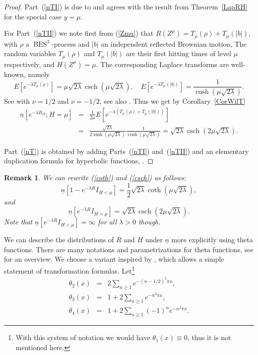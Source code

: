 \documentclass[11pt]{scrartcl}
\newtheorem{remark}[theorem]{Remark}
\newcommand{\nbid}{\underline{n}}
\DeclareMathOperator{\BES}{BES}
\DeclareMathOperator{\csch}{csch}
\begin{document}
\begin{proof}
Part~(\ref{nTI}) is due to \cite[p.66]{YY} and agrees with the result from Theorem~\ref{LapRH} for the special case $y=\mu$.

For Part~(\ref{nTII}) we note first from (\ref{Zmu}) that $R(Z^\mu)=T_\mu(\rho)+T_\mu(|b|)$,
with $\rho$ a $\BES^3$-process and $|b|$ an independent reflected Brownian motion,
The random variables $T_\mu(\rho)$ and $T_\mu(|b|)$ are their
first hitting times of level $\mu$ respectively, and $H(Z^\mu)=\mu$.
The corresponding Laplace transforms are well-known, namely
\begin{equation}
E[e^{-\lambda T_\mu(\rho)}]=\mu\sqrt{2\lambda}\csch(\mu\sqrt{2\lambda}),\quad
E[e^{-\lambda T_\mu(|b|)}]=\frac1{\cosh(\mu\sqrt{2\lambda})}.
\end{equation}
See \cite[(3.8), p.762]{Ken1978} with $\nu=1/2$ and $\nu=-1/2$, 
see also \cite[Tab.2, Row 3, Col.3, p.450 and Sec.4.5, p.453]{BPY2001}.
Thus we get by Corollary~\ref{CorWilT}
\begin{eqnarray}
\nbid[e^{-\lambda R_{II}};H=\mu]&=&
\frac1{2\mu}E[e^{-\lambda(T_\mu(\rho)+T_\mu(|b|))}]\\
&=&
\frac{\sqrt{2\lambda}}{2\sinh(\mu\sqrt{2\lambda})}
\frac1{\cosh(\mu\sqrt{2\lambda})}
=\sqrt{2\lambda}\csch(2\mu\sqrt{2\lambda}).
\end{eqnarray}


Part~(\ref{nT}) is obtained by adding Parts~(\ref{nTI}) and~(\ref{nTII}) and an elementary
duplication formula for hyperbolic functions, \cite[4.5.31, p.84]{AS}.
\end{proof}

\begin{remark}
We can rewrite (\ref{coth}) and (\ref{csch}) as follows: 
\begin{equation}  \label{coth-alt}
\underline{n}[1-e^{-\lambda R}I_{H<\mu}]= \frac12\sqrt{2\lambda}\coth(\mu\sqrt{2\lambda}),
\end{equation}
and 
\begin{equation}  \label{csch-alt}
\underline{n}[e^{-\lambda R}I_{H=\mu}]=\sqrt{2\lambda}\csch(2\mu\sqrt{2\lambda}).
\end{equation}
Note that $\underline{n}[e^{-\lambda R}I_{H<\mu}]=\infty$ for all $\lambda>0 $ though.
\end{remark}

We can describe the distributions of $R$ and $H$ under $\underline{n}$ more
explicitly using theta functions. There are many notations and
parametrizations for theta functions, see \cite[Sec.21.9, p.487]{WW} for an
overview. We choose a variant inspired by \cite{Dev2009}, which allows a
simple statement of transformation formulas. Let\footnote{With this system of notation we would have $\theta _{1}(x)\equiv 0$, thus it
is not mentioned here.} 
\begin{eqnarray}
\theta _{2}(x) &=&2\sum_{n\geq 1}e^{-(n-1/2)^{2}\pi x}, \\
\theta _{3}(x) &=&1+2\sum_{n\geq 1}e^{-n^{2}\pi x},\label{t3} \\
\theta _{4}(x) &=&1+2\sum_{n\geq 1}(-1)^{n}e^{-n^{2}\pi x}.
\end{eqnarray}
\end{document}
